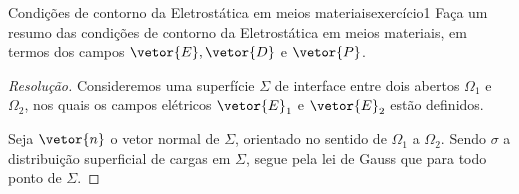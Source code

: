 \begin{exercício}{Condições de contorno da Eletrostática em meios materiais}{exercício1}
    Faça um resumo das condições de contorno da Eletrostática em meios materiais, em termos dos campos \(\vetor{E}, \vetor{D}\) e \(\vetor{P}\).
\end{exercício}
\begin{proof}[Resolução]
    Consideremos uma superfície \(\Sigma\) de interface entre dois abertos \(\Omega_1\) e \(\Omega_2\), nos quais os campos elétricos \(\vetor{E}_1\) e \(\vetor{E}_2\) estão definidos.
    \begin{center}
    \end{center}
    Seja \(\vetor{n}\) o vetor normal de \(\Sigma\), orientado no sentido de \(\Omega_1\) a \(\Omega_2\). Sendo \(\sigma\) a distribuição superficial de cargas em \(\Sigma\), segue pela lei de Gauss que
    para todo ponto de \(\Sigma\).


\end{proof}
